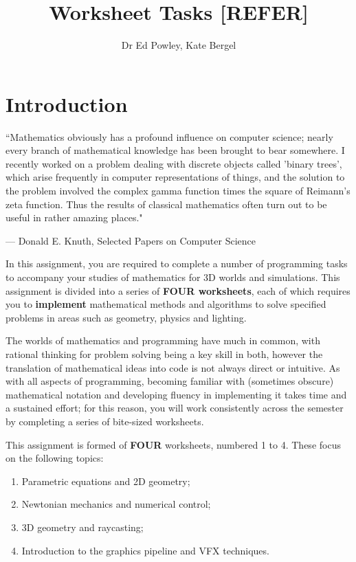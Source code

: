 \documentclass{../../fal_assignment}
\title{Worksheet Tasks [REFER]}
\author{Dr Ed Powley, Kate Bergel}
\begin{document}
\maketitle

\section*{Introduction}

\begin{marginquote}
``Mathematics obviously has a profound influence on computer science; nearly every branch of mathematical knowledge has been brought to bear somewhere. I recently worked on a problem dealing with discrete objects called 'binary trees', which arise frequently in computer representations of things, and the solution to the problem involved the complex gamma function times the square of  Reimann's zeta function. Thus the results of classical mathematics often turn out to be useful in rather amazing places."

\par --- Donald E. Knuth, Selected Papers on Computer Science
\end{marginquote}

In this assignment, you are required to complete a number of programming tasks to accompany your studies of mathematics for 3D worlds and simulations. This assignment is divided into a series of \textbf{FOUR worksheets}, each of which requires you to \textbf{implement} mathematical methods and algorithms to solve specified problems in areas such as geometry, physics and lighting.

The worlds of mathematics and programming have much in common, with rational thinking for problem solving being a key skill in both, however the translation of mathematical ideas into code is not always direct or intuitive. As with all aspects of programming, becoming familiar with (sometimes obscure) mathematical notation and developing fluency in implementing it takes time and a sustained effort; for this reason, you will work consistently across the semester by completing a series of bite-sized worksheets.

This assignment is formed of \textbf{FOUR} worksheets, numbered 1 to 4.
These focus on the following topics:
\begin{enumerate}[label=\arabic*)]
	\item Parametric equations and 2D geometry;
	\item Newtonian mechanics and numerical control;
	\item 3D geometry and raycasting;
	\item Introduction to the graphics pipeline and VFX techniques.
\end{enumerate}
\end{document}
